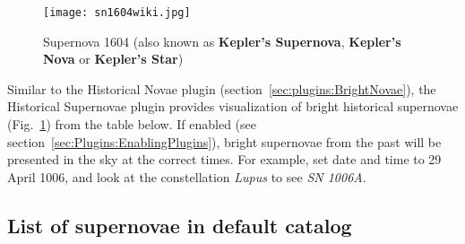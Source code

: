 \begin{figure}[ht]
\texttt{[image: sn1604wiki.jpg]}
\label{fig:SN1604}
\caption{Supernova 1604 (also known as \textbf{Kepler's Supernova}, \textbf{Kepler's Nova} or \textbf{Kepler's Star})}
\end{figure}


\noindent Similar to the Historical Novae plugin
(section~\ref{sec:plugins:BrightNovae}), the Historical Supernovae
plugin provides visualization of bright historical supernovae
(Fig.~\ref{fig:SN1604}) from the table below.
If enabled (see section~\ref{sec:Plugins:EnablingPlugins}), bright
supernovae from the past will be presented in the sky at the correct
times. For example, set date and time to 29 April 1006, and look at the constellation \emph{Lupus} to see \emph{SN 1006A}.


\subsection{List of supernovae in default catalog}
\label{sec:plugins:HistoricalSupernovae:list}


